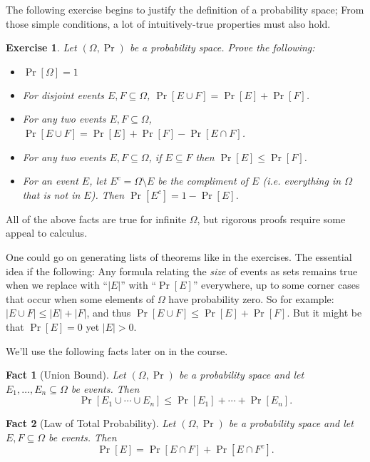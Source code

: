 \documentclass[11pt]{article}
\newtheorem{fact}{Fact}
\newtheorem{exercise}{Exercise}
\begin{document}
The following exercise begins to justify the definition of a probability
space; From those simple conditions, a lot of intuitively-true properties
must also hold.
\begin{exercise}
    Let $(\Omega,\Pr)$ be a probability space.
    Prove the following: 
    \begin{itemize}
        \item $\Pr[\Omega] = 1$
        \item For disjoint events $E,F\subseteq \Omega$, 
            $\Pr[E\cup F] = \Pr[E] + \Pr[F]$.
        \item For any two events $E,F\subseteq \Omega$, 
            $\Pr[E\cup F] = \Pr[E] + \Pr[F] - \Pr[E\cap F]$.
        \item For any two events $E,F\subseteq \Omega$, if $E\subseteq F$
            then $\Pr[E] \leq \Pr[F]$.
        \item For an event $E$, let $E^c = \Omega \setminus E$ be the
            compliment of $E$ (i.e. everything in $\Omega$ that is not in
            $E$). Then $\Pr[E^c] = 1 - \Pr[E]$.
    \end{itemize}
\end{exercise}
All of the above facts are true for infinite $\Omega$, but rigorous proofs
require some appeal to calculus.

One could go on generating lists of theorems like in the exercises. The
essential idea if the following: Any formula relating the \emph{size} of
events as sets remains true when we replace with ``$|E|$'' with ``$\Pr[E]$''
everywhere, up to some corner cases that occur when some elements of $\Omega$ have
probability zero. So for example: $|E\cup F| \leq |E| + |F|$, and
thus $\Pr[E\cup F] \leq \Pr[E] + \Pr[F]$. But it might be that $\Pr[E]=0$
yet $|E| > 0$. 

We'll use the following facts later on in the course.

\begin{fact}[Union Bound]
    Let $(\Omega,\Pr)$ be a probability space 
    and let $E_1,\ldots,E_n\subseteq \Omega$ be events. Then
    \[
        \Pr[E_1 \cup \cdots \cup E_n] \leq
        \Pr[E_1] + \cdots + \Pr[E_n].
    \]
\end{fact}

\begin{fact}[Law of Total Probability]
    Let $(\Omega,\Pr)$ be a probability space 
    and let $E,F\subseteq \Omega$ be events. Then
    \[
        \Pr[E] = \Pr[E\cap F] + \Pr[E \cap F^c].
    \]
\end{fact}
\end{document}

